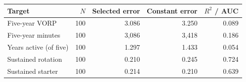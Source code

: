 \begin{tabular}{lrrrr}
\toprule
Target & $N$ & Selected error & Constant error & $R^2$ / AUC \\
\midrule
Five-year VORP & 100 & 3.086 & 3.250 & 0.089 \\
Five-year minutes & 100 & 3,086 & 3,418 & 0.186 \\
Years active (of five) & 100 & 1.297 & 1.433 & 0.054 \\
Sustained rotation & 100 & 0.210 & 0.245 & 0.724 \\
Sustained starter & 100 & 0.214 & 0.210 & 0.639 \\
\bottomrule
\end{tabular}